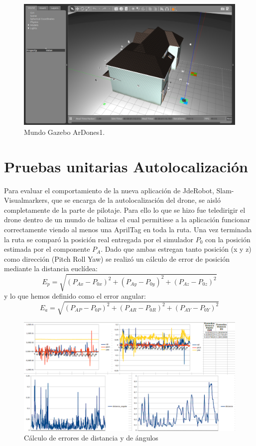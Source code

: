 \begin{figure}[H]
	\begin{center}
		\includegraphics[width=1\textwidth]{imag/IMG28.png}
				\caption{Mundo Gazebo ArDones1.}
		\label{fig:Mundo Gazebo.}	
	\end{center}
\end{figure}


\section{Pruebas unitarias Autolocalización}
\hspace{1cm} Para evaluar el comportamiento de la nueva aplicación de JdeRobot, Slam-Visualmarkers, que se encarga de la autolocalización del drone, se aisló completamente de la parte de pilotaje. Para ello lo que se hizo fue teledirigir el drone dentro de un mundo de balizas el cual permitiese a la aplicación funcionar correctamente viendo al menos una AprilTag en toda la ruta. Una vez terminada la ruta se comparó la posición real entregada por el simulador $P_{0}$ con la posición estimada por el componente $P_{A} $. Dado que ambas estregan tanto posición (x y z) como dirección (Pitch Roll Yaw) se realizó un cálculo de error de posición mediante la distancia euclídea: 
\[ E_{p} = \sqrt{(P_{Ax}-P_{0x})^{2}+(P_{Ay}-P_{0y})^{2}+(P_{Az}-P_{0z})^{2}}\]
y lo que hemos definido como el error angular:    
\[ E_{a} = \sqrt{(P_{AP}-P_{0P})^{2}+(P_{AR}-P_{0R})^{2}+(P_{AY}-P_{0Y})^{2}}\]

\begin{figure}[H]
	\begin{center}
		\includegraphics[width=1\textwidth]{imag/IMG36.png}
				\caption{Cálculo de errores de distancia y de ángulos}
		\label{fig:Error de distancia y de giro.}	
	\end{center}
\end{figure}

